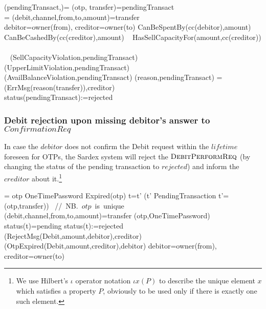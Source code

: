 \begin{asm}
(pendingTransact,)=\+
 \LET (otp, transfer)=pendingTransact\\ 
 \LET = (debit,channel,from,to,amount)=transfer\\
  \LET debitor=owner(from), creditor=owner(to)\+
  \IF CanBeSpentBy(cc(debitor),amount) \+
    \THEN ~ \IF CanBeCashedBy(cc(creditor),amount) \+
      \THEN ~ \IF HasSellCapacityFor(amount,cc(creditor)) \+
         \THEN ~  \\
         \ELSE ~ 
               (SellCapacityViolation,pendingTransact) \-
     \ELSE ~ 
     (UpperLimitViolation,pendingTransact) \-
  \ELSE ~  
    (AvailBalanceViolation,pendingTransact) \dec\-
\WHERE \+
(reason,pendingTransact)  =\+
   (ErrMsg(reason(transfer)),\TO creditor)\\
   status(pendingTransact):=rejected  
\end{asm}


\subsubsection{Debit rejection upon missing debitor's answer to $ConfirmationReq$}\label{sect:debitreject}

In case the $debitor$ does not confirm the Debit request within the $lifetime$ foreseen for OTPs, the Sardex system will reject the $\hbox{\sc DebitPerformReq}$ (by changing the status of the pending transaction to $rejected$) and inform the $creditor$ about it.\footnote{We use Hilbert's $\iota$ operator notation $\iota x(P)$ to describe the unique element $x$ which satisfies a property $P$, obviously to be used only if there is exactly one such element.}

\begin{asm}  
 =\+           
  \IF otp \in OneTimePassword \AND Expired(otp)  \THEN  \+
  \LET t=\iota t' (t'  \in PendingTransaction \AND 
       t'=(otp,transfer)) \mbox{ // NB. $otp$ is unique}\\
   \LET (debit,channel,from,to,amount)=transfer \+
       (otp,OneTimePassword) \\
      \IF status(t)=pending \THEN \+
         status(t):=rejected\\
         (RejectMsg(Debit,amount,debitor),\TO creditor)\\  
         (OtpExpired(Debit,amount,creditor),\TO debitor)  \dec \-
  \WHERE debitor=owner(from), creditor=owner(to)
\end{asm}

